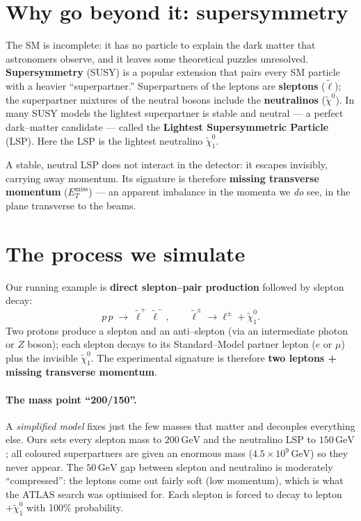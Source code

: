 \documentclass[11pt,oneside]{report}
\newcommand{\slep}{\tilde{\ell}}
\newcommand{\neut}{\tilde{\chi}^0_1}
\newcommand{\GeV}{\,\text{GeV}}
\begin{document}
\section{Why go beyond it: supersymmetry}
The SM is incomplete: it has no particle to explain the dark matter that astronomers observe, and
it leaves some theoretical puzzles unresolved. \textbf{Supersymmetry} (SUSY) is a popular extension
that pairs every SM particle with a heavier ``superpartner.'' Superpartners of the leptons are
\textbf{sleptons} ($\slep$); the superpartner mixtures of the neutral bosons include the
\textbf{neutralinos} ($\tilde\chi^0$). In many SUSY models the lightest superpartner is stable and
neutral --- a perfect dark--matter candidate --- called the \textbf{Lightest Supersymmetric
Particle} (LSP). Here the LSP is the lightest neutralino $\neut$.

A stable, neutral LSP does not interact in the detector: it escapes invisibly, carrying away
momentum. Its signature is therefore \textbf{missing transverse momentum} ($E_T^{\text{miss}}$) ---
an apparent imbalance in the momenta we \emph{do} see, in the plane transverse to the beams.

\section{The process we simulate}
Our running example is \textbf{direct slepton--pair production} followed by slepton decay:
\begin{equation}
  p\,p \;\to\; \slep^{+}\,\slep^{-}, \qquad
  \slep^{\pm} \to \ell^{\pm} + \neut .
  \label{eq:process}
\end{equation}
Two protons produce a slepton and an anti--slepton (via an intermediate photon or $Z$ boson); each
slepton decays to its Standard--Model partner lepton ($e$ or $\mu$) plus the invisible $\neut$. The
experimental signature is therefore \textbf{two leptons + missing transverse momentum}.

\paragraph{The mass point ``200/150''.} A \emph{simplified model} fixes just the few masses that
matter and decouples everything else. Ours sets every slepton mass to $200\GeV$ and the neutralino
LSP to $150\GeV$; all coloured superpartners are given an enormous mass ($4.5\times10^{9}\GeV$) so
they never appear. The $50\GeV$ gap between slepton and neutralino is moderately ``compressed'':
the leptons come out fairly soft (low momentum), which is what the ATLAS search was optimised for.
Each slepton is forced to decay to lepton~$+\neut$ with 100\% probability.
\end{document}
